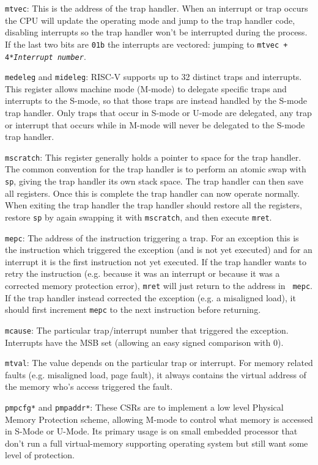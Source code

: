 {\tt mtvec}: This is the address of the trap handler.  When an
interrupt or trap occurs the CPU will update the operating mode and
jump to the trap handler code, disabling interrupts so the trap
handler won't be interrupted during the process.  If the last two bits
are {\tt 01b} the interrupts are vectored: jumping to {\tt mtvec +
  4*{\it Interrupt number}}.

{\tt medeleg} and {\tt mideleg}: RISC-V supports up to 32 distinct
traps and interrupts.  This register allows machine mode (M-mode) to
delegate specific traps and interrupts to the S-mode, so that those
traps are instead handled by the S-mode trap handler.  Only traps that
occur in S-mode or U-mode are delegated, any trap or interrupt that
occurs while in M-mode will never be delegated to the S-mode trap
handler.

{\tt mscratch}: This register generally holds a pointer to space for
the trap handler.  The common convention for the trap handler is to
perform an atomic swap with {\tt sp}, giving the trap handler its own
stack space.  The trap handler can then save all registers.  Once this
is complete the trap handler can now operate normally.  When exiting
the trap handler the trap handler should restore all the registers,
restore {\tt sp} by again swapping it with {\tt mscratch}, and then
execute {\tt mret}.

{\tt mepc}: The address of the instruction triggering a trap.  For an
exception this is the instruction which triggered the exception (and
is not yet executed) and for an interrupt it is the first instruction
not yet executed.  If the trap handler wants to retry the instruction
(e.g. because it was an interrupt or because it was a corrected memory
protection error), {\tt mret} will just return to the address in {\tt
  mepc}.  If the trap handler instead corrected the exception (e.g. a
misaligned load), it should first increment {\tt mepc} to the next
instruction before returning.

{\tt mcause}: The particular trap/interrupt number that triggered the
exception.  Interrupts have the MSB set (allowing an easy signed
comparison with 0).

{\tt mtval}: The value depends on the particular trap or interrupt.
For memory related faults (e.g. misaligned load, page fault), it
always contains the virtual address of the memory who's access
triggered the fault.

{\tt pmpcfg*} and {\tt pmpaddr*}: These CSRs are to implement a low
level Physical Memory Protection scheme, allowing M-mode to control
what memory is accessed in S-Mode or U-Mode.  Its primary usage is on
small embedded processor that don't run a full virtual-memory
supporting operating system but still want some level of protection.

